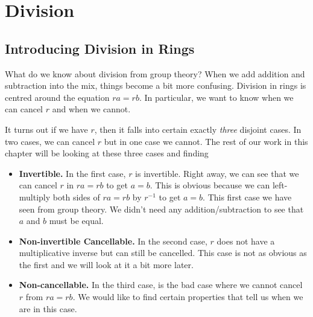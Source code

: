 
\chapter{Division}




\section{Introducing Division in Rings}

What do we know about division from group theory?
When we add addition and subtraction into the mix, things become a bit more confusing. 
Division in rings is centred around the equation $ra = rb$. In particular, we want to know 
when we can cancel $r$ and when we cannot. 

It turns out if we have $r$, then it falls into certain exactly \textit{three} disjoint cases. 
In two cases, we can cancel $r$ but in one case we cannot. The rest of our work in this chapter 
will be looking at these three cases and finding 

\begin{itemize}	
\renewcommand{\labelitemi}{$\Box$}
\item \textbf{Invertible.} In the first case, $r$ is invertible. Right away, we can see that we can 
cancel $r$ in $ra = rb$ to get $a = b$. This is obvious because we can left-multiply 
both sides of $ra = rb$ by $r^{-1}$ to get $a =b$. This first case we have seen from group theory. We didn't 
need any addition/subtraction to see that $a$ and $b$ must be equal.
\item \textbf{Non-invertible Cancellable.} In the second case, $r$ does not have a multiplicative inverse 
but can still be cancelled. This case is not as obvious as the first and we will look at it a bit more 
later.
\item \textbf{Non-cancellable.} In the third case, is the bad case where we cannot cancel $r$ from $ra = rb$. 
We would like to find certain properties that tell us when we are in this case. 
\end{itemize}




\begin{figure}[h]
\end{figure}

